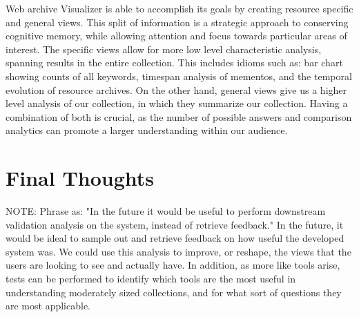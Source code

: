 \documentclass[10pt,journal,compsoc]{IEEEtran}
\begin{document}
Web archive Visualizer is able to accomplish its goals by creating resource specific and general views. This split of information is a strategic approach to conserving cognitive memory, while allowing attention and focus towards particular areas of interest. The specific views allow for more low level characteristic analysis, spanning results in the entire collection. This includes idioms such as: bar chart showing counts of all keywords, timespan analysis of mementos, and the temporal evolution of resource archives. On the other hand, general views give us a higher level analysis of our collection, in which they summarize our collection. Having a combination of both is crucial, as the number of possible answers and comparison analytics can promote a larger understanding within our audience. \par

\section{Final Thoughts}

NOTE: Phrase as: "In the future it would be useful to perform downstream validation analysis on the system, instead of retrieve feedback."
In the future, it would be ideal to sample out and retrieve feedback on how useful the developed system was. We could use this analysis to improve, or reshape, the views that the users are looking to see and actually have. In addition, as more like tools arise, tests can be performed to identify which tools are the most useful in understanding moderately sized collections, and for what sort of questions they are most applicable. \par


\ifCLASSOPTIONcaptionsoff
  \newpage
\fi




{}


%
%
\end{document}

